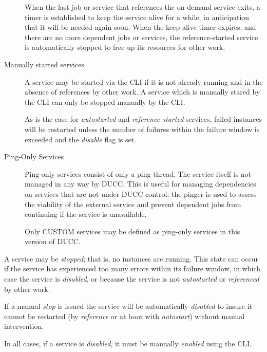 \begin{description}
           When the last job or service that references the on-demand service exits, a timer is
           established to keep the service alive for a while, in anticipation that it will be needed
           again soon.  When the keep-alive timer expires, and there are no more dependent jobs or
           services, the reference-started service is automatically stopped to free up its resources
           for other work.

        \item[Manually started services] A service may be started via the CLI if it is not
          already running and in the absence of references by other work.  A service which is
          manually stared by the CLI can only be stopped manually by the CLI.

          As is the case for {\em autostarted} and {\em reference-started} services, failed 
          instances will be restarted unless the number of failures within the failure window
          is exceeded and the {\em disable} flag is set.  

        \item[Ping-Only Services] 
          \label{subsub:services.ping-only}
          Ping-only services consist of only
          a ping thread.  The service itself is not managed in any way by DUCC.  This is useful for
          managing dependencies on services that are not under DUCC control: the pinger is used
          to assess the viability of the external service and prevent dependent jobs from
          continuing if the service is unavailable.

          Only CUSTOM services may be defined as ping-only services in this version of DUCC.

      \end{description}

      A service may be {\em stopped}; that is, no instances are running.  This state can occur
      if the service has experienced too many errors within its failure window, in which case
      the service is {\em disabled}, or because the service is not {\em autostarted} or {\em referenced} by
      other work. 

      If a manual {\em stop} is issued the service will be automatically {\em disabled} to insure it
      cannot be restarted (by {\em reference} or at boot with {\em autostart}) without manual
      intervention.

      In all cases, if a service is {\em disabled}, it must be manually {\em enabled} using the CLI.


